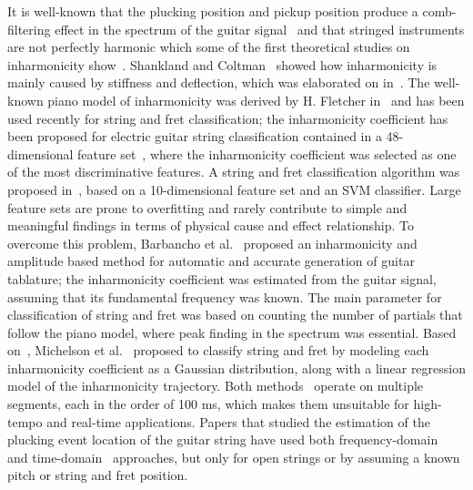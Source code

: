 \documentclass{article}
\begin{document}
It is well-known that the plucking position and pickup position produce a comb-filtering effect in the spectrum of the guitar signal~\cite{fletcher:plucked_strings,fletcher:principles_of_vibration_and_sound} and that stringed instruments are not perfectly harmonic which some of the first theoretical studies on inharmonicity show~\cite{donkin:acoustics,rayleigh:sound}. Shankland and Coltman~\cite{coltShank} showed how inharmonicity is mainly caused by stiffness and deflection, which was elaborated on in~\cite{rossing:science_of_string_instruments}. The well-known piano model of inharmonicity was derived by H. Fletcher in~\cite{fletcher:piano_model} and has been used recently for string and fret classification; the inharmonicity coefficient has been proposed for electric guitar string classification contained in a 48-dimensional feature set~\cite{abesser:automatic_string_detection_ml}, where the inharmonicity coefficient was selected as one of the most discriminative features. A string and fret classification algorithm was proposed in~\cite{dittmar:realtime_string_detection}, based on a 10-dimensional feature set and an SVM classifier. Large feature sets are prone to overfitting and rarely contribute to simple and meaningful findings in terms of physical cause and effect relationship. 
To overcome this problem, Barbancho et al.~\cite{barbancho:inharmonicity_tablature} proposed an inharmonicity and amplitude based method for automatic and accurate generation of guitar tablature; the inharmonicity coefficient was estimated from the guitar signal, assuming that its fundamental frequency was known. The main parameter for classification of string and fret was based on counting the number of partials that follow the piano model, where peak finding in the spectrum was essential. Based on~\cite{barbancho:inharmonicity_tablature}, Michelson et al.~\cite{michelson2018_aes} proposed to classify string and fret by modeling each inharmonicity coefficient as a Gaussian distribution, along with a linear regression model of the inharmonicity trajectory. Both methods~\cite{barbancho:inharmonicity_tablature,michelson2018_aes} operate on multiple segments, each in the order of 100 ms, which makes them unsuitable for high-tempo and real-time applications.
Papers that studied the estimation of the plucking event location of the guitar string have used both frequency-domain~\cite{DBLP:conf/icassp/MohamadDH17,traube:pluckin_point_dafx,traube2003extraction} and time-domain~\cite{penttinen2004time} approaches, but only for open strings or by assuming a known pitch or string and fret position. \\
\end{document}
